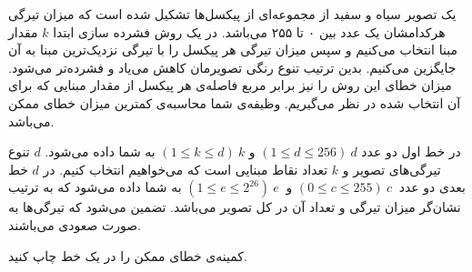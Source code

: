 \documentclass[11.5pt,a4paper,oneside]{article}
\begin{document}
\def\problemCode{Compression}
\def\problemEnglishTitle{Image Compression}
\def\problemFarsiTitle{فشرده‌سازی تصویر}
\def\timeLimit{$2$ \second}
\def\memLimit{$256$ \megabytes}
\begin{problem}
یک تصویر سیاه و سفید از مجموعه‌ای از پیکسل‌ها تشکیل شده است که میزان تیرگی هرکدامشان یک عدد بین ۰ تا ۲۵۵ می‌باشد. در یک روش فشرده سازی ابتدا $k$ مقدار مبنا انتخاب می‌کنیم و سپس میزان تیرگی هر پیکسل را با تیرگی نزدیک‌ترین مبنا به آن جایگزین می‌کنیم. بدین ترتیب تنوع رنگی تصویرمان کاهش می‌یاد و فشرده‌تر می‌شود. میزان خطای این روش را نیز برابر مربع فاصله‌ی هر پیکسل از مقدار مبنایی که برای آن انتخاب شده در نظر می‌گیریم.
وظیفه‌ی شما محاسبه‌ی کمترین میزان خطای ممکن می‌باشد.

در خط اول دو عدد $( 1 \leq d \leq 256)\:   d$ و $(1 \leq k \leq d)\:k$ به شما داده می‌شود. $d$ تنوع تیرگی‌های تصویر و $k$ تعداد نقاط مبنایی است که می‌خواهیم انتخاب کنیم. در $d$
 خط بعدی دو عدد $(0 \leq c \leq 255)\: c\:$ و $(1 \leq e \leq 2^{26})\: e \:$
به شما داده می‌شود که به ترتیب نشان‌گر میزان تیرگی و تعداد آن در کل تصویر می‌باشد. تضمین می‌شود که تیرگی‌ها به صورت صعودی می‌باشند. 

\outputDescription
کمینه‌ی خطای ممکن را در یک خط چاپ کنید.

\begin{example}
%
%
%
\end{example}

\end{problem}
\end{document}
